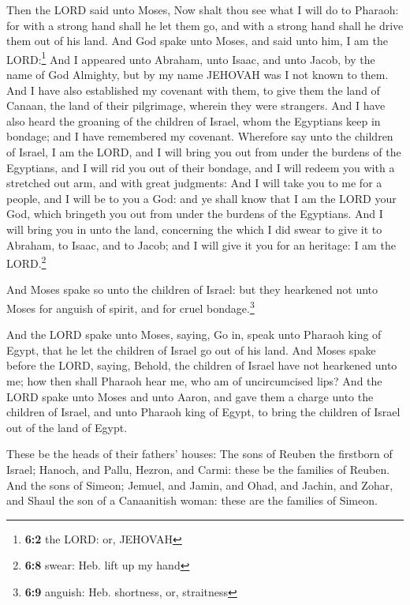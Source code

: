  Then the LORD said unto Moses, Now shalt thou see what I
will do to Pharaoh: for with a strong hand shall he let them go, and
with a strong hand shall he drive them out of his land. 
And God spake unto Moses, and said unto him, I am the LORD:\footnote{\textbf{6:2}
  the LORD: or, JEHOVAH}  And I appeared unto Abraham,
unto Isaac, and unto Jacob, by the name of God Almighty, but by my name
JEHOVAH was I not known to them.  And I have also
established my covenant with them, to give them the land of Canaan, the
land of their pilgrimage, wherein they were strangers. 
And I have also heard the groaning of the children of Israel, whom the
Egyptians keep in bondage; and I have remembered my covenant.
 Wherefore say unto the children of Israel, I am the LORD,
and I will bring you out from under the burdens of the Egyptians, and I
will rid you out of their bondage, and I will redeem you with a
stretched out arm, and with great judgments:  And I will
take you to me for a people, and I will be to you a God: and ye shall
know that I am the LORD your God, which bringeth you out from under the
burdens of the Egyptians.  And I will bring you in unto
the land, concerning the which I did swear to give it to Abraham, to
Isaac, and to Jacob; and I will give it you for an heritage: I am the
LORD.\footnote{\textbf{6:8} swear: Heb. lift up my hand}

 And Moses spake so unto the children of Israel: but they
hearkened not unto Moses for anguish of spirit, and for cruel
bondage.\footnote{\textbf{6:9} anguish: Heb. shortness, or, straitness}

 And the LORD spake unto Moses, saying, 
Go in, speak unto Pharaoh king of Egypt, that he let the children of
Israel go out of his land.  And Moses spake before the
LORD, saying, Behold, the children of Israel have not hearkened unto me;
how then shall Pharaoh hear me, who am of uncircumcised lips?
 And the LORD spake unto Moses and unto Aaron, and gave
them a charge unto the children of Israel, and unto Pharaoh king of
Egypt, to bring the children of Israel out of the land of Egypt.

 These be the heads of their fathers' houses: The sons of
Reuben the firstborn of Israel; Hanoch, and Pallu, Hezron, and Carmi:
these be the families of Reuben.  And the sons of Simeon;
Jemuel, and Jamin, and Ohad, and Jachin, and Zohar, and Shaul the son of
a Canaanitish woman: these are the families of Simeon.

